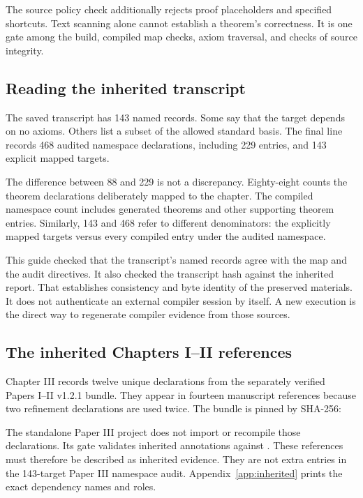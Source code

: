 The source policy check additionally rejects proof placeholders and specified shortcuts. Text scanning alone cannot establish a theorem's correctness. It is one gate among the build, compiled map checks, axiom traversal, and checks of source integrity.

\subsection{Reading the inherited transcript}
The saved transcript has 143 named records. Some say that the target depends on no axioms. Others list a subset of the allowed standard basis. The final line records 468 audited namespace declarations, including 229  entries, and 143 explicit mapped targets.

The difference between 88 and 229 is not a discrepancy. Eighty-eight counts the theorem declarations deliberately mapped to the chapter. The compiled namespace count includes generated theorems and other supporting theorem entries. Similarly, 143 and 468 refer to different denominators: the explicitly mapped targets versus every compiled entry under the audited namespace.

This guide checked that the transcript's named records agree with the map and the audit directives. It also checked the transcript hash against the inherited report. That establishes consistency and byte identity of the preserved materials. It does not authenticate an external compiler session by itself. A new execution is the direct way to regenerate compiler evidence from those sources.

\subsection{The inherited Chapters I--II references}
Chapter III records twelve unique declarations from the separately verified Papers I--II v1.2.1 bundle. They appear in fourteen manuscript references because two refinement declarations are used twice. The bundle is pinned by SHA-256:

{\small{}}

The standalone Paper III project does not import or recompile those declarations. Its gate validates inherited annotations against . These references must therefore be described as inherited evidence. They are not extra entries in the 143-target Paper III namespace audit. Appendix~\ref{app:inherited} prints the exact dependency names and roles.

